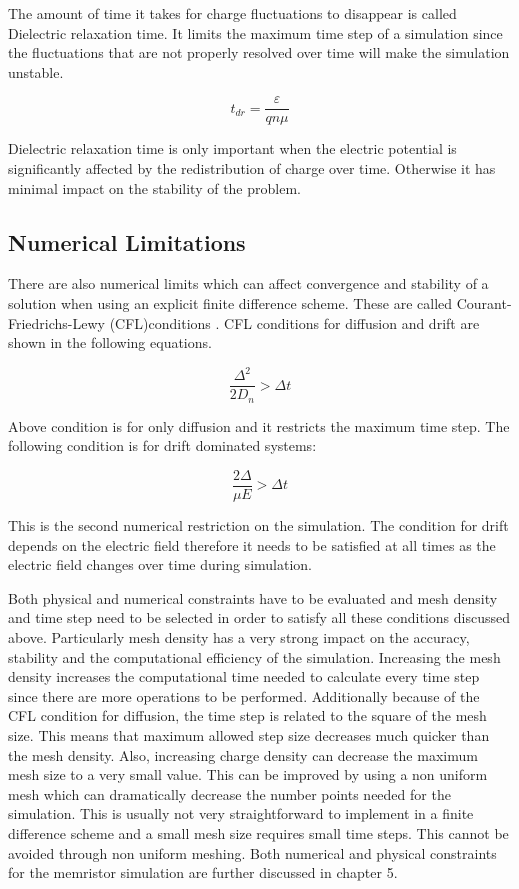 \begin{doublespace}
The amount of time it takes for charge fluctuations to disappear is called Dielectric relaxation time. It limits the maximum time step of a simulation since the fluctuations that are not properly resolved over time will make the simulation unstable.

\begin{equation}
t_{dr}=\frac{\varepsilon}{q n \mu}
\label{tdr}
\end{equation}

Dielectric relaxation time is only important when the electric potential is significantly affected by the redistribution of charge over time. Otherwise it has minimal impact on the stability of the problem.
\subsection{Numerical Limitations}

There are also numerical limits which can affect convergence and stability of a solution when using an explicit finite difference scheme. These are called Courant-Friedrichs-Lewy (CFL)conditions \cite{NumModel}. CFL conditions for diffusion and drift are shown in the following equations.

\begin{equation}
\frac{\Delta ^2}{2 D_n}>\Delta t
\label{CFL_Diff}
\end{equation}

Above condition is for only diffusion and it restricts the maximum time step. The following condition is for drift dominated systems:

\begin{equation}
\frac{2 \Delta }{\mu E}>\Delta t
\label{CFL_Drift}
\end{equation}

This is the second numerical restriction on the simulation. The condition for drift depends on the electric field therefore it needs to be satisfied at all times as the electric field changes over time during simulation.

Both physical and numerical constraints have to be evaluated and mesh density and time step need to be selected in order to satisfy all these conditions discussed above. Particularly mesh density has a very strong impact on the accuracy, stability and the computational efficiency of the simulation. Increasing the mesh density increases the computational time needed to calculate every time step since there are more operations to be performed. Additionally because of the CFL condition for diffusion, the time step is related to the square of the mesh size. This means that maximum allowed step size decreases much quicker than the mesh density. Also, increasing charge density can decrease the maximum mesh size to a very small value. This can be improved by using a non uniform mesh which can dramatically decrease the number points needed for the simulation. This is usually not very straightforward to implement in a finite difference scheme and a small mesh size requires small time steps. This cannot be avoided through non uniform meshing. Both numerical and physical constraints for the memristor simulation are further discussed in chapter 5.


\end{doublespace}

